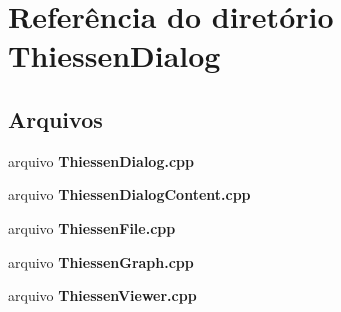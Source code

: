 \section{Referência do diretório Thiessen\+Dialog}
\label{dir_f2f4db054cdb44f8389a015a9670da8b}
\subsection*{Arquivos}
\begin{DoxyCompactItemize}
\item 
arquivo {\bf Thiessen\+Dialog.\+cpp}
\item 
arquivo {\bf Thiessen\+Dialog\+Content.\+cpp}
\item 
arquivo {\bf Thiessen\+File.\+cpp}
\item 
arquivo {\bf Thiessen\+Graph.\+cpp}
\item 
arquivo {\bf Thiessen\+Viewer.\+cpp}
\end{DoxyCompactItemize}
